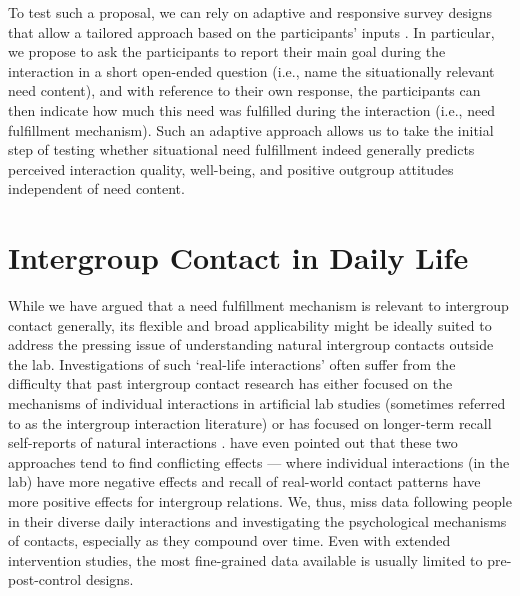 \documentclass[man, 12pt, a4paper, mask]{apa7}
\theoremstyle{break}
\theoremstyle{plain}
\begin{document}
To test such a proposal, we can rely on adaptive and responsive survey designs that allow a tailored approach based on the participants' inputs \citep[e.g.,][]{Tourangeau2017}. In particular, we propose to ask the participants to report their main goal during the interaction in a short open-ended question (i.e., name the situationally relevant need content), and with reference to their own response, the participants can then indicate how much this need was fulfilled during the interaction (i.e., need fulfillment mechanism). Such an adaptive approach allows us to take the initial step of testing whether situational need fulfillment indeed generally predicts perceived interaction quality, well-being, and positive outgroup attitudes independent of need content. 

\section{Intergroup Contact in Daily Life}
While we have argued that a need fulfillment mechanism is relevant to intergroup contact generally, its flexible and broad applicability might be ideally suited to address the pressing issue of understanding natural intergroup contacts outside the lab. Investigations of such `real-life interactions' often suffer from the difficulty that past intergroup contact research has either focused on the mechanisms of individual interactions in artificial lab studies (sometimes referred to as the intergroup interaction literature) or has focused on longer-term recall self-reports of natural interactions \citep[commonly referred to as the intergroup contact literature; also see][]{Pettigrew2006}. \citet[][]{MacInnis2015} have even pointed out that these two approaches tend to find conflicting effects --- where individual interactions (in the lab) have more negative effects and recall of real-world contact patterns have more positive effects for intergroup relations. We, thus, miss data following people in their diverse daily interactions and investigating the psychological mechanisms of contacts, especially as they compound over time. Even with extended intervention studies, the most fine-grained data available is usually limited to pre-post-control designs. 
\end{document}
